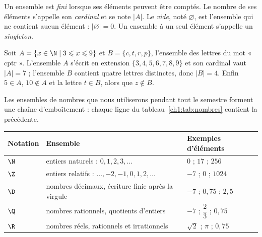 \begin{definition}
Un ensemble est \emph{fini} lorsque ses éléments peuvent être comptés. Le nombre de ses éléments s'appelle son \emph{cardinal} et se note $|A|$. Le \emph{vide}, noté $\varnothing$, est l'ensemble qui ne contient aucun élément : $|\varnothing| = 0$. Un ensemble à un seul élément s'appelle un \emph{singleton}.
\end{definition}

\begin{exemple}
Soit $A = \{x \in \N \mid 3 \leqslant x \leqslant 9\}$ et $B = \{c, t, r, p\}$, l'ensemble des lettres du mot « cptr ». L'ensemble $A$ s'écrit en extension $\{3, 4, 5, 6, 7, 8, 9\}$ et son cardinal vaut $|A| = 7$ ; l'ensemble $B$ contient quatre lettres distinctes, donc $|B| = 4$. Enfin $5 \in A$, $10 \notin A$ et la lettre $t \in B$, alors que $z \notin B$.
\end{exemple}

Les ensembles de nombres que nous utiliserons pendant tout le semestre forment une chaîne d'emboîtement : chaque ligne du tableau~\ref{ch1:tab:nombres} contient la précédente.

\begin{center}
\small
\begin{tabular}{L{1.6cm}L{7.4cm}L{6.6cm}}
\toprule
{}\textbf{Notation} & \textbf{Ensemble} & \textbf{Exemples d'éléments}\\
\midrule
$\N$ & entiers naturels : $0, 1, 2, 3, \dots$ & $0$ ; $17$ ; $256$\\
$\Z$ & entiers relatifs : $\dots, -2, -1, 0, 1, 2, \dots$ & $-7$ ; $0$ ; $1024$\\
$\D$ & nombres décimaux, écriture finie après la virgule & $-7$ ; $0{,}75$ ; $2{,}5$\\
$\Q$ & nombres rationnels, quotients d'entiers & $-7$ ; $\dfrac{2}{3}$ ; $0{,}75$\\
$\R$ & nombres réels, rationnels et irrationnels & $\sqrt{2}$ ; $\pi$ ; $0{,}75$\\
\bottomrule
\end{tabular}
\label{ch1:tab:nombres}
\end{center}

